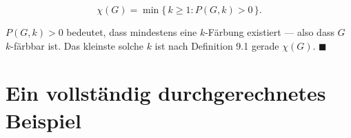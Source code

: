 \begin{merksatz}
\[ \chi(G) = \min\{\, k \ge 1 : P(G,k) > 0 \,\} . \]

$P(G,k) > 0$ bedeutet, dass mindestens eine $k$-Färbung existiert --- also dass $G$ $k$-färbbar ist. Das kleinste solche $k$ ist nach Definition 9.1 gerade $\chi(G)$. $\blacksquare$

\begin{center}
\begin{minipage}{0.88\textwidth}
\end{minipage}
\end{center}
\end{merksatz}

\section{Ein vollständig durchgerechnetes Beispiel}

